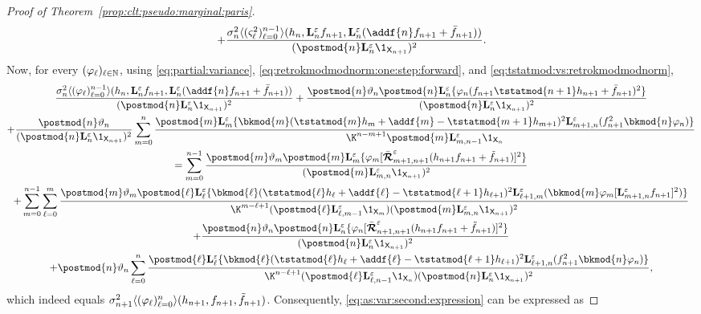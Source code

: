 \begin{proof}[Proof of Theorem~\ref{prop:clt:pseudo:marginal:paris}]
\begin{multline*}
+ \frac{\sigma^2_n \langle (\ukestvar{\ell})_{\ell = 0}^{n - 1} \rangle(h_n, \ukmod{n} f_{n + 1}, \ukmod{n}(\addf{n} f_{n + 1} + \bar{f}_{n + 1}))}{(\postmod{n} \ukmod{n} \1_{\Xset_{n + 1}})^2}. 
\end{multline*}
Now, for every $(\varphi_\ell)_{\ell \in \mathbb{N}}$, using \eqref{eq:partial:variance}, \eqref{eq:retrokmodmodnorm:one:step:forward}, and \eqref{eq:tstatmod:vs:retrokmodmodnorm}, 
\begin{multline*}
\frac{\sigma^2_n \langle (\varphi_\ell)_{\ell = 0}^{n - 1} \rangle(h_n, \ukmod{n} f_{n + 1}, \ukmod{n}(\addf{n} f_{n + 1} + \bar{f}_{n + 1}))}{(\postmod{n} \ukmod{n} \1_{\Xset_{n + 1}})^2} 
+ \frac{\postmod{n} \adjfuncforward{n} \postmod{n} \ukmod{n} \{\varphi_n(f_{n + 1} \tstatmod{n + 1} h_{n + 1} + \bar{f}_{n + 1})^2 \}}{(\postmod{n} \ukmod{n} \1_{\Xset_{n + 1}})^2} \\
+ \frac{\postmod{n} \adjfuncforward{n}}{(\postmod{n} \ukmod{n} \1_{\Xset_{n + 1}})^2} \sum_{m = 0}^n \frac{\postmod{m} \ukmod{m}\{\bkmod{m}(\tstatmod{m} h_m + \addf{m} - \tstatmod{m + 1} h_{m + 1})^2 \ukmod{m + 1, n}(f_{n + 1}^2 \bkmod{n} \varphi_n)\}}{\K^{n - m + 1} \postmod{m} \ukmod{m, n - 1} \1_{\Xset_n}} \\
= \sum_{m = 0}^{n - 1} \frac{\postmod{m} \adjfuncforward{m} \postmod{m} \ukmod{m} \{ \varphi_m [\retrokmodmodnorm_{m + 1, n + 1} (h_{n + 1} f_{n + 1} + \ftd{n + 1})]^2\}}{(\postmod{m} \ukmod{m, n} \1_{\Xset_{n + 1}})^2} \\
+ \sum_{m = 0}^{n - 1} \sum_{\ell = 0}^m \frac{\postmod{m} \adjfuncforward{m} \postmod{\ell} \ukmod{\ell} \{\bkmod{\ell}(\tstatmod{\ell} h_{\ell} + \addf{\ell} - \tstatmod{\ell + 1} h_{\ell +1})^2 \ukmod{\ell + 1, m}( \bkmod{m} \varphi_m 
[\ukmod{m + 1, n} f_{n + 1}]^2 
)\}}{\K^{m - \ell + 1} (\postmod{\ell} \ukmod{\ell, m - 1} \1_{\Xset_m})(\postmod{m} \ukmod{m, n} \1_{\Xset_{n + 1}})^2} \\
+ \frac{\postmod{n} \adjfuncforward{n} \postmod{n} \ukmod{n} \{ \varphi_n  
[\retrokmodmodnorm_{n + 1, n + 1} (h_{n + 1} f_{n + 1} + \ftd{n + 1})]^2 
\}}{(\postmod{n} \ukmod{n} \1_{\Xset_{n + 1}})^2} \\
+ \postmod{n} \adjfuncforward{n} \sum_{\ell = 0}^n \frac{\postmod{\ell} \ukmod{\ell} \{\bkmod{\ell}(\tstatmod{\ell} h_\ell + \addf{\ell} - \tstatmod{\ell + 1} h_{\ell + 1})^2 \ukmod{\ell + 1, n}(f_{n + 1}^2 \bkmod{n} \varphi_n)\}}{\K^{n - \ell + 1} (\postmod{\ell} \ukmod{\ell, n - 1} \1_{\Xset_n}) (\postmod{n} \ukmod{n} \1_{\Xset_{n + 1}})^2}, 
\end{multline*}
which indeed equals $\sigma^2_{n + 1} \langle (\varphi_\ell)_{\ell = 0}^n \rangle(h_{n + 1}, f_{n + 1}, \tilde{f}_{n + 1})$. Consequently, \eqref{eq:as:var:second:expression} can be expressed as 

\end{proof}
